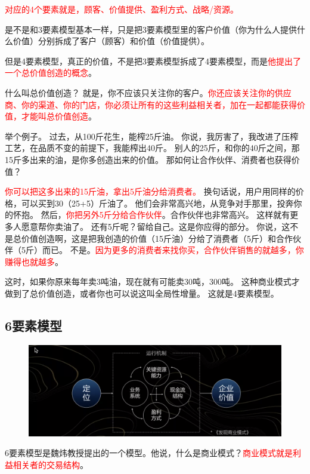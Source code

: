 \documentclass[12pt]{article}
\begin{document}
\textcolor{red}{对应的4个要素就是，顾客、价值提供、盈利方式、战略/资源。 }

是不是和3要素模型基本一样，只是把3要素模型里的客户价值（你为什么人提供什么价值）分别拆成了客户（顾客）和价值（价值提供）。 

但是4要素模型，真正的价值，不是把3要素模型拆成了4要素模型，而是\textcolor{red}{他提出了一个总价值创造的概念}。

什么叫总价值创造？ 就是，你不应该只关注你的客户。\textcolor{red}{你还应该关注你的供应商、你的渠道、你的门店，你必须让所有的这些利益相关者，加在一起都能获得价值，才能叫总价值创造}。 

举个例子。 过去，从100斤花生，能榨25斤油。 你说，我厉害了，我改进了压榨工艺，在品质不变的前提下，我能榨出40斤。 别人的25斤，和你的40斤之间，那15斤多出来的油，是你多创造出来的价值。 那如何让合作伙伴、消费者也获得价值？ 

\textcolor{red}{你可以把这多出来的15斤油，拿出5斤油分给消费者。 }换句话说，用户用同样的价格，可以买到30（25+5）斤油了。 他们会非常高兴地，从竞争对手那里，投奔你的怀抱。 然后，\textcolor{red}{你把另外5斤分给合作伙伴}。合作伙伴也非常高兴。 这样就有更多人愿意帮你卖油了。 还有5斤呢？留给自己。这是你应得的部分。 你说，这不是总价值创造啊，这是把我创造的价值（15斤油）分给了消费者（5斤）和合作伙伴（5斤）而已。 不是。\textcolor{red}{因为更多的消费者来找你买，合作伙伴销售的就越多，你赚得也就越多}。 

这时，如果你原来每年卖3吨油，现在就有可能卖30吨，300吨。 这种商业模式才做到了总价值创造，或者你也可以说这叫全局性增量。 这就是4要素模型。

\subsection{6要素模型}
\begin{figure}[H]
    \centering
    \includegraphics[width=1\textwidth]{fig/BusinessModel_4.png}
\end{figure}
6要素模型是魏炜教授提出的一个模型。他说，什么是商业模式？\textcolor{red}{商业模式就是利益相关者的交易结构}。
\end{document}
